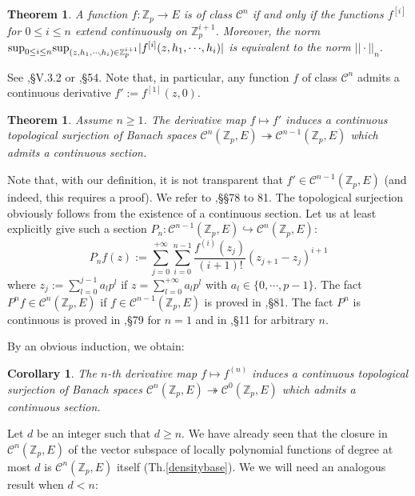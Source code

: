 \documentclass[11pt]{amsart}
\def\Z{{\mathbb Z}_p}
\newtheorem{thm}[definit]{\bf{Theorem}}
\newtheorem{cor}[definit]{\bf{Corollary}}
\begin{document}
\begin{thm}\label{ordreentier} 
A function $f:\Z\rightarrow E$ is of class ${\mathcal C}^n$ if and
only if the functions $f^{[i]}$ for $0\leq i\leq n$ extend
continuously on $\Z^{i+1}$. Moreover, the norm ${\rm sup}_{0\leq i\leq
  n}{\rm sup}_{(z,h_1,\cdots\!,h_i)\in
  \Z^{i+1}}|f^{[i]}(z,h_1,\cdots\!,h_i)|$ is equivalent to the norm
$|\!|\cdot|\!|_n$. 
\end{thm} 
 
See \cite{Co2},\S V.3.2 or \cite{Schi},\S54. Note that, in particular,
any function $f$ of class ${\mathcal C}^n$ admits a continuous
derivative $f':=f^{[1]}(z,0)$.  

\begin{thm} 
Assume $n\geq 1$. The derivative map $f\mapsto f'$ induces a
continuous topological surjection of Banach spaces ${\mathcal
C}^n(\Z,E)\twoheadrightarrow {\mathcal C}^{n-1}(\Z,E)$ which admits
a continuous section.  
\end{thm} 
 
Note that, with our definition, it is not transparent that $f'\in
{\mathcal C}^{n-1}(\Z,E)$ (and indeed, this requires a proof). We
refer to \cite{Schi},\S\S78 to 81. The topological surjection
obviously follows from the existence of a continuous section. Let us
at least explicitly give such a section $P_n:{\mathcal
  C}^{n-1}(\Z,E)\hookrightarrow {\mathcal C}^{n}(\Z,E)$: 
$$P_nf(z):=\sum_{j=0}^{+\infty}\sum_{i=0}^{n-1}
\frac{f^{(i)}(z_j)}{(i+1)!}(z_{j+1}-z_j)^{i+1}$$ 
where $z_j:=\sum_{l=0}^{j-1}a_lp^l$ if $z=\sum_{l=0}^{+\infty}a_lp^l$
with $a_l\in\{0,\cdots,p-1\}$. The fact $P^nf\in {\mathcal
  C}^{n}(\Z,E)$ if $f\in {\mathcal C}^{n-1}(\Z,E)$ is proved in
\cite{Schi},\S81. The fact $P^n$ is continuous is proved in
\cite{Schi},\S79 for $n=1$ and in \cite{Schi2},\S11 for arbitrary $n$.
 
By an obvious induction, we obtain: 
 
\begin{cor}\label{derivsurj} 
The $n$-th derivative map $f\mapsto f^{(n)}$ induces a continuous
topological surjection of Banach spaces ${\mathcal
  C}^n(\Z,E)\twoheadrightarrow {\mathcal C}^{0}(\Z,E)$ which admits a
continuous section.  
\end{cor} 
 
Let $d$ be an integer such that $d\geq n$. We have already seen that
the closure in ${\mathcal C}^n(\Z,E)$ of the vector subspace of
locally polynomial functions of degree at most $d$ is ${\mathcal
  C}^n(\Z,E)$ itself (Th.\ref{densitybase}). We we will need an
analogous result when $d<n$: 
\end{document}
